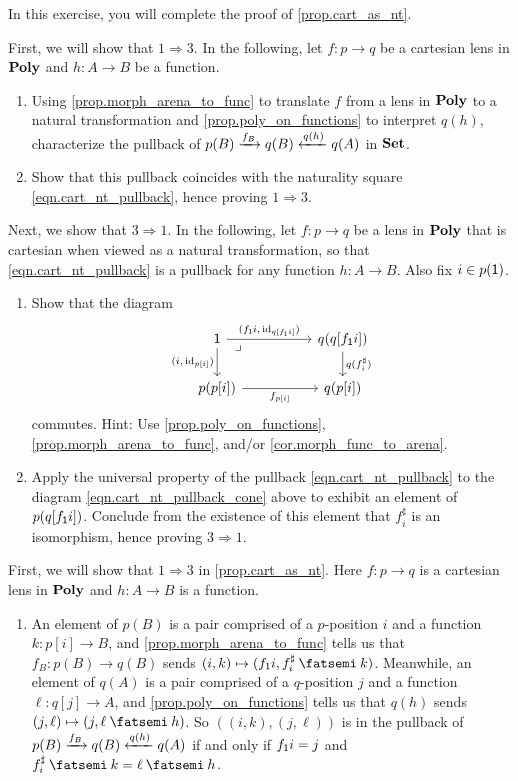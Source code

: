 \documentclass[Book-Poly]{subfiles}
\begin{document}
\begin{exercise} \label{exc.cart_as_nt}
In this exercise, you will complete the proof of \cref{prop.cart_as_nt}.

First, we will show that $1\Rightarrow3$.
In the following, let $f\colon p\to q$ be a cartesian lens in $\mathbf{Poly}$ and $h\colon A\to B$ be a function.
\begin{enumerate}
    \item Using \cref{prop.morph_arena_to_func} to translate $f$ from a lens in $\mathbf{Poly}$ to a natural transformation and \cref{prop.poly_on_functions} to interpret $q(h)$, characterize the pullback of $p(B)\xrightarrow{f_B}q(B)\xleftarrow{q(h)}q(A)$ in $\mathbf{Set}$.
    \item Show that this pullback coincides with the naturality square \eqref{eqn.cart_nt_pullback}, hence proving $1\Rightarrow3$.
\end{enumerate}
Next, we show that $3\Rightarrow1$.
In the following, let $f\colon p\to q$ be a lens in $\mathbf{Poly}$ that is cartesian when viewed as a natural transformation, so that \eqref{eqn.cart_nt_pullback} is a pullback for any function $h\colon A\to B$.
Also fix $i\in p(\textsf{1})$.
\begin{enumerate}[resume]
    \item Show that the diagram
    \begin{equation} \label{eqn.cart_nt_pullback_cone}
        \begin{tikzcd}[column sep=50pt]
        	\1 \ar[r, "{(f_\1i,\,\id_{q[f_\1i]})}"]\ar[d, "{(i,\,\id_{p[i]})}"']&
        	q(q[f_\1i])\ar[d, "q(f^\sharp_i)"]\\
        	p(p[i])\ar[r, "f_{p[i]}"']&
        	q(p[i])\ar[ul, phantom, very near end, "\lrcorner"]
        \end{tikzcd}
    \end{equation}
    commutes.
    Hint: Use \cref{prop.poly_on_functions}, \cref{prop.morph_arena_to_func}, and/or \cref{cor.morph_func_to_arena}.
    \item Apply the universal property of the pullback \eqref{eqn.cart_nt_pullback} to the diagram \eqref{eqn.cart_nt_pullback_cone} above to exhibit an element of $p(q[f_{\textsf{1}}i])$.
    Conclude from the existence of this element that $f^\sharp_i$ is an isomorphism, hence proving $3\Rightarrow1$.\qedhere
\end{enumerate}
\begin{solution}
First, we will show that $1\Rightarrow3$ in \cref{prop.cart_as_nt}.
Here $f\colon p\to q$ is a cartesian lens in $\mathbf{Poly}$ and $h\colon A\to B$ is a function.
\begin{enumerate}
    \item An element of $p(B)$ is a pair comprised of a $p$-position $i$ and a function $k\colon p[i]\to B$, and \cref{prop.morph_arena_to_func} tells us that $f_B\colon p(B)\to q(B)$ sends $(i,k)\mapsto(f_\1i,f^\sharp_i\then k)$.
    Meanwhile, an element of $q(A)$ is a pair comprised of a $q$-position $j$ and a function $\ell\colon q[j]\to A$, and \cref{prop.poly_on_functions} tells us that $q(h)$ sends $(j,\ell)\mapsto(j,\ell\then h)$.
    So $((i,k),(j,\ell))$ is in the pullback of $p(B)\xrightarrow{f_B}q(B)\xleftarrow{q(h)}q(A)$ if and only if $f_{\textsf{1}}i=j$ and $f^\sharp_i\then k=\ell\then h$.


\end{enumerate}
\end{solution}
\end{exercise}
\end{document}
